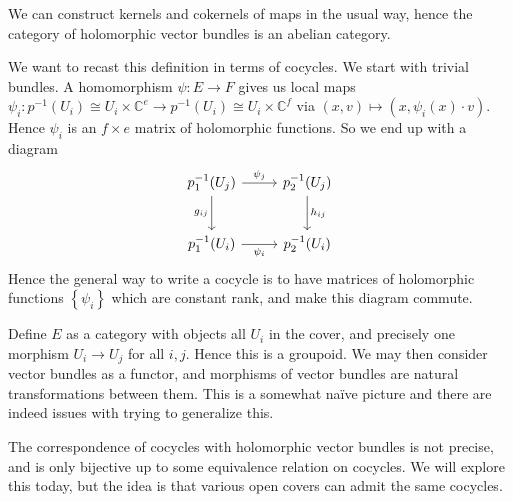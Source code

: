 We can construct kernels and cokernels of maps in the usual way, hence the category of holomorphic vector bundles is an abelian category.

We want to recast this definition in terms of cocycles. We start with trivial bundles. A homomorphism $\psi : E \to F$ gives us local maps $\psi _i : p ^{-1} (U_i)\cong U_i\times \mathbb{C} ^e \to p ^{-1} (U_i)\cong U_i\times \mathbb{C} ^f$ via $(x,v)\mapsto (x,\psi _i(x)\cdot v)$. Hence $\psi _i$ is an $f\times e$ matrix of holomorphic functions. So we end up with a diagram
\[\begin{tikzcd}[row sep = 2.5em, column sep = 2.5em]
p_1 ^{-1} (U_j)\ar[" \psi _j ", r] \ar[" g_{ij}  "', d]  & p_2 ^{-1} (U_j)\ar[" h_{ij}  ", d]  \\
p_1 ^{-1} (U_i)\ar[" \psi _i "', r]  & p_2 ^{-1} (U_i)
\end{tikzcd}\]
Hence the general way to write a cocycle is to have matrices of holomorphic functions $\left\{ \psi _i \right\} $ which are constant rank, and make this diagram commute.

\begin{remark}
	Define $E$ as a category with objects all $U_i$ in the cover, and precisely one morphism $U_i \to U_j$ for all $i,j$. Hence this is a groupoid. We may then consider vector bundles as a functor, and morphisms of vector bundles are natural transformations between them. This is a somewhat na\"ive picture and there are indeed issues with trying to generalize this.
\end{remark}



The correspondence of cocycles with holomorphic vector bundles is not precise, and is only bijective up to some equivalence relation on cocycles. We will explore this today, but the idea is that various open covers can admit the same cocycles.
